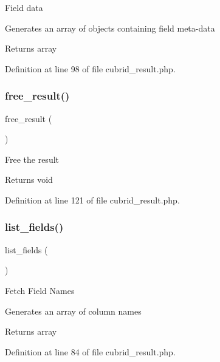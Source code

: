 Field data

Generates an array of objects containing field meta-\/data

\begin{DoxyReturn}{Returns}
array 
\end{DoxyReturn}


Definition at line 98 of file cubrid\+\_\+result.\+php.

\mbox{\label{class_c_i___d_b__cubrid__result_aad2d98d6beb3d6095405356c6107b473}} 
\subsubsection{\texorpdfstring{free\_result()}{free\_result()}}
{\footnotesize\ttfamily free\+\_\+result (\begin{DoxyParamCaption}{ }\end{DoxyParamCaption})}

Free the result

\begin{DoxyReturn}{Returns}
void 
\end{DoxyReturn}


Definition at line 121 of file cubrid\+\_\+result.\+php.

\mbox{\label{class_c_i___d_b__cubrid__result_a50b54eb4ea7cfd039740f532988ea776}} 
\subsubsection{\texorpdfstring{list\_fields()}{list\_fields()}}
{\footnotesize\ttfamily list\+\_\+fields (\begin{DoxyParamCaption}{ }\end{DoxyParamCaption})}

Fetch Field Names

Generates an array of column names

\begin{DoxyReturn}{Returns}
array 
\end{DoxyReturn}


Definition at line 84 of file cubrid\+\_\+result.\+php.

